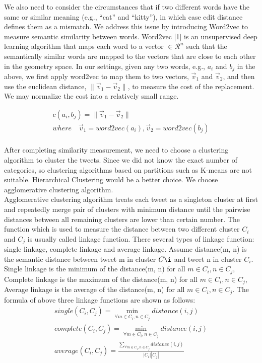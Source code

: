 \documentclass[10pt]{article}
\begin{document}
\begin{itemize}
\begin{itemize}
We also need to consider the circumstances that if two different words have the same or similar meaning (e.g., “cat” and “kitty”), in which case edit distance defines them as a mismatch. We address this issue by introducing Word2vec to measure semantic similarity between words. 
Word2vec [1] is an unsupervised  deep learning algorithm that maps each word to a vector  $\in \mathcal{R}^n$ such that the semantically similar words are mapped to the vectors that are close to each other in the geometry space. 
In our settings, given any two words, e.g.,  $a_i$ and $b_j$ in the above, we first apply word2vec to map them to two vectors, $\vec{v}_1$ and $\vec{v}_2$, and then use the euclidean distance, $\lVert \vec{v}_1 - \vec{v}_2 \rVert$, to measure the cost of the replacement.
We may normalize the cost into a relatively small range. 

$$
\begin{array}{c}
c(a_i, b_j)=\lVert \vec{v}_1 - \vec{v}_2 \rVert \\
 where \quad  \vec{v}_1 = word2vec(a_i), \vec{v}_2=word2vec(b_j)
\end{array}
$$
\\
After completing similarity measurement, we need to choose a clustering algorithm to cluster the tweets. Since we did not know the  exact number of categories, so clustering algorithms based on partitions such as K-means are not suitable. Hierarchical Clustering would be a better choice. We choose agglomerative clustering algorithm. \\

Agglomerative clustering algorithm treats each tweet as a singleton cluster at first and repeatedly merge 
pair of clusters with minimum distance until the pairwise distances between all remaining clusters are lower than certain number. The function which is used to measure the distance between two different cluster $C_i$ and $C_j$ is usually called linkage function. There several types of linkage function: single linkage, complete linkage and average linkage. Assume distance(m, n) is the semantic distance between tweet m in cluster $C\i$ and tweet n in cluster $C_i$. Single linkage is the minimum of the distance(m, n) for all $m \in C_i, n \in C_j $, Complete linkage is the maximum of the distance(m, n) for all $m \in C_i, n \in C_j $, Average linkage is the average of the distance(m, n) for all $m \in C_i, n \in C_j $. The formula of above three linkage functions are shown as follows:
\begin{equation*}
  \begin{aligned}
 single(C_i, C_j) =\min_{\forall m \in C_i, n \in C_j} {distance(i, j)} \\
 complete(C_i, C_j) =\min_{\forall m \in C_i, n \in C_j} {distance(i, j)} \\
average(C_i, C_j) =\frac {\sum\limits_{\forall m \in C_i, n \in C_j} {distance(i, j)}}{|C_i| |C_j|  }
 \end{aligned}
 \end{equation*}




\end{itemize}
\end{itemize}
\end{document}
